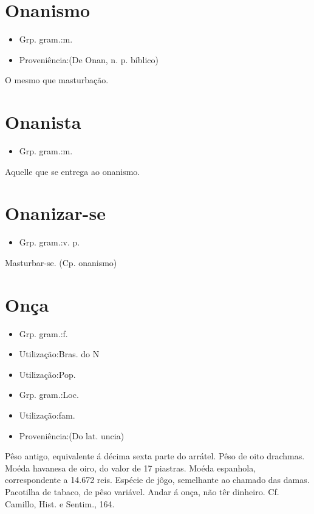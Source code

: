 \section{Onanismo}
\begin{itemize}
\item {Grp. gram.:m.}
\end{itemize}
\begin{itemize}
\item {Proveniência:(De \textunderscore Onan\textunderscore , n. p. bíblico)}
\end{itemize}
O mesmo que \textunderscore masturbação\textunderscore .
\section{Onanista}
\begin{itemize}
\item {Grp. gram.:m.}
\end{itemize}
Aquelle que se entrega ao onanismo.
\section{Onanizar-se}
\begin{itemize}
\item {Grp. gram.:v. p.}
\end{itemize}
Masturbar-se.
(Cp. \textunderscore onanismo\textunderscore )
\section{Onça}
\begin{itemize}
\item {Grp. gram.:f.}
\end{itemize}
\begin{itemize}
\item {Utilização:Bras. do N}
\end{itemize}
\begin{itemize}
\item {Utilização:Pop.}
\end{itemize}
\begin{itemize}
\item {Grp. gram.:Loc.}
\end{itemize}
\begin{itemize}
\item {Utilização:fam.}
\end{itemize}
\begin{itemize}
\item {Proveniência:(Do lat. \textunderscore uncia\textunderscore )}
\end{itemize}
Pêso antigo, equivalente á décima sexta parte do arrátel.
Pêso de oito drachmas.
Moéda havanesa de oiro, do valor de 17 piastras.
Moéda espanhola, correspondente a 14.672 reis.
Espécie de jôgo, semelhante ao chamado das damas.
Pacotilha de tabaco, de pêso variável.
\textunderscore Andar á onça\textunderscore , não têr dinheiro. Cf. Camillo, \textunderscore Hist. e Sentim.\textunderscore , 164.

